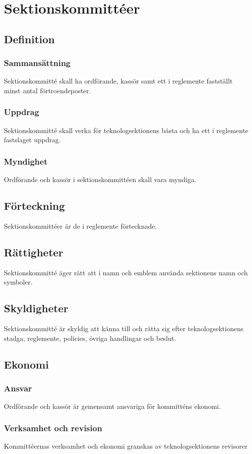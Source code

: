 \section{Sektionskommittéer}

\subsection{Definition}

\subsubsection{Sammansättning}
Sektionskommitté skall ha ordförande, kassör samt ett i reglemente fastställt minst antal förtroendeposter.

\subsubsection{Uppdrag}
Sektionskommitté skall verka för teknologsektionens bästa och ha ett i reglemente fastslaget uppdrag.

\subsubsection{Myndighet}
Ordförande och kassör i sektionskommittéen skall vara myndiga.

\subsection{Förteckning}

Sektionskommittéer är de i reglemente förtecknade.

\subsection{Rättigheter}

Sektionskommitté äger rätt att i namn och emblem använda sektionens namn och symboler.

\subsection{Skyldigheter}

Sektionskommitté är skyldig att känna till och rätta sig efter teknologsektionens stadga, reglemente, policies, övriga handlingar och beslut.

\subsection{Ekonomi}
\subsubsection{Ansvar}
Ordförande och kassör är gemensamt ansvariga för kommitténs ekonomi.

\subsubsection{Verksamhet och revision}
Kommittéernas verksamhet och ekonomi granskas av teknologsektionens revisorer

